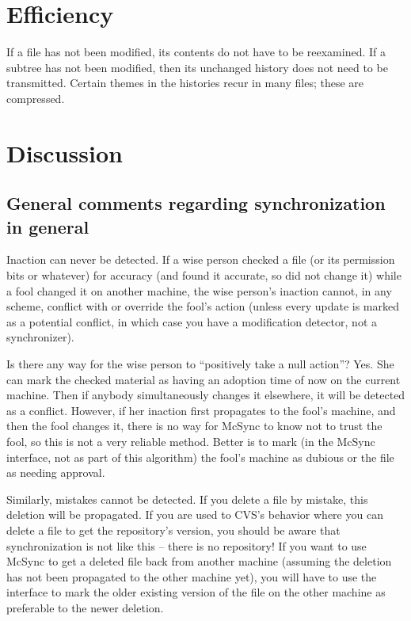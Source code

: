 \documentclass{book}
\begin{document}
\section{Efficiency}

If a file has not been modified, its contents do not have to be reexamined.
If a subtree has not been modified, then its unchanged history does not need to be transmitted.
Certain themes in the histories recur in many files; these are compressed.





\section{Discussion}


\subsection{General comments regarding synchronization in general}

Inaction can never be detected.  If a wise person checked a file (or its permission bits or whatever) for accuracy (and found it accurate, so did not change it) while a fool changed it on another machine, the wise person's inaction cannot, in any scheme, conflict with or override the fool's action (unless every update is marked as a potential conflict, in which case you have a modification detector, not a synchronizer).

Is there any way for the wise person to ``positively take a null action''?  Yes.  She can mark the checked material as having an adoption time of now on the current machine.  Then if anybody simultaneously changes it elsewhere, it will be detected as a conflict.  However, if her inaction first propagates to the fool's machine, and then the fool changes it, there is no way for McSync to know not to trust the fool, so this is not a very reliable method.  Better is to mark (in the McSync interface, not as part of this algorithm) the fool's machine as dubious or the file as needing approval.

Similarly, mistakes cannot be detected.  If you delete a file by mistake, this deletion will be propagated.  If you are used to CVS's behavior where you can delete a file to get the repository's version, you should be aware that synchronization is not like this -- there is no repository!  If you want to use McSync to get a deleted file back from another machine (assuming the deletion has not been propagated to the other machine yet), you will have to use the interface to mark the older existing version of the file on the other machine as preferable to the newer deletion.
\end{document}
